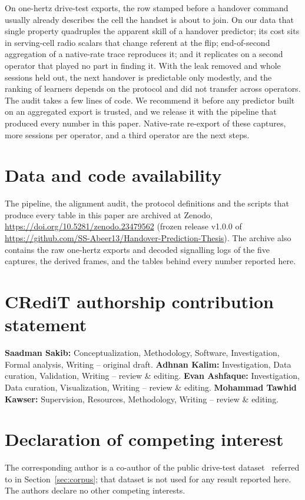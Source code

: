 \documentclass[5p,times,twocolumn]{elsarticle}
\begin{document}
On one-hertz drive-test exports, the row stamped before a handover command usually already describes the cell the handset is about to join. On our data that single property quadruples the apparent skill of a handover predictor; its cost sits in serving-cell radio scalars that change referent at the flip; end-of-second aggregation of a native-rate trace reproduces it; and it replicates on a second operator that played no part in finding it. With the leak removed and whole sessions held out, the next handover is predictable only modestly, and the ranking of learners depends on the protocol and did not transfer across operators. The audit takes a few lines of code. We recommend it before any predictor built on an aggregated export is trusted, and we release it with the pipeline that produced every number in this paper. Native-rate re-export of these captures, more sessions per operator, and a third operator are the next steps.

\section*{Data and code availability}
The pipeline, the alignment audit, the protocol definitions and the scripts that produce every table in this paper are archived at Zenodo, \url{https://doi.org/10.5281/zenodo.23479562} (frozen release v1.0.0 of \url{https://github.com/SS-Abeer13/Handover-Prediction-Thesis}). The archive also contains the raw one-hertz exports and decoded signalling logs of the five captures, the derived frames, and the tables behind every number reported here.

\section*{CRediT authorship contribution statement}
\textbf{Saadman Sakib:} Conceptualization, Methodology, Software, Investigation, Formal analysis, Writing -- original draft. \textbf{Adhnan Kalim:} Investigation, Data curation, Validation, Writing -- review \& editing. \textbf{Evan Ashfaque:} Investigation, Data curation, Visualization, Writing -- review \& editing. \textbf{Mohammad Tawhid Kawser:} Supervision, Resources, Methodology, Writing -- review \& editing.

\section*{Declaration of competing interest}
The corresponding author is a co-author of the public drive-test dataset~\cite{ref38} referred to in Section~\ref{sec:corpus}; that dataset is not used for any result reported here. The authors declare no other competing interests.
\end{document}
